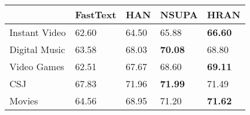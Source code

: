 \begin{table}[t]
    \centering
    \begin{tabular}{@{}lllll@{}}
    \toprule
                        & FastText  &  HAN  & NSUPA  & HRAN         \\ \midrule
    Instant Video       & 62.60        & 64.50 &   65.88   & \textbf{66.60}          \\
    Digital Music       & 63.58        &   68.03   &   \textbf{70.08}   & 68.80          \\
    Video Games         & 62.51       &   67.67  &   68.60   & \textbf{69.11}            \\
    CSJ	                & 67.83        &    71.96  &   \textbf{71.99}   & 71.49          \\
    Movies              & 64.56       &   68.95   	&   71.20   & \textbf{71.62 }           \\\bottomrule
    \end{tabular}
    \label{tab:sentacc} 
    \end{table}